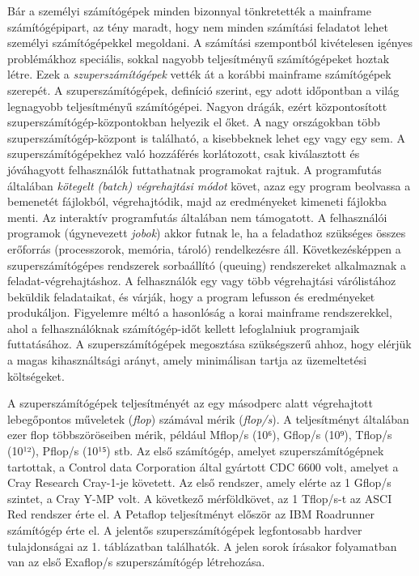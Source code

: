 \documentclass[
]{article}
\begin{document}
Bár a személyi számítógépek minden bizonnyal tönkretették a mainframe
számítógépipart, az tény maradt, hogy nem minden számítási feladatot
lehet személyi számítógépekkel megoldani. A számítási szempontból
kivételesen igényes problémákhoz speciális, sokkal nagyobb teljesítményű
számítógépeket hoztak létre. Ezek a \emph{szuperszámítógépek} vették át
a korábbi mainframe számítógépek szerepét. A szuperszámítógépek,
definíció szerint, egy adott időpontban a világ legnagyobb teljesítményű
számítógépei. Nagyon drágák, ezért központosított
szuperszámítógép-központokban helyezik el őket. A nagy országokban több
szuperszámítógép-központ is található, a kisebbeknek lehet egy vagy egy
sem. A szuperszámítógépekhez való hozzáférés korlátozott, csak
kiválasztott és jóváhagyott felhasználók futtathatnak programokat
rajtuk. A programfutás általában \emph{kötegelt (batch) végrehajtási
módot} követ, azaz egy program beolvassa a bemenetét fájlokból,
végrehajtódik, majd az eredményeket kimeneti fájlokba menti. Az
interaktív programfutás általában nem támogatott. A felhasználói
programok (úgynevezett \emph{jobok}) akkor futnak le, ha a feladathoz
szükséges összes erőforrás (processzorok, memória, tároló) rendelkezésre
áll. Következésképpen a szuperszámítógépes rendszerek sorbaállító
(queuing) rendszereket alkalmaznak a feladat-végrehajtáshoz. A
felhasználók egy vagy több végrehajtási várólistához beküldik
feladataikat, és várják, hogy a program lefusson és eredményeket
produkáljon. Figyelemre méltó a hasonlóság a korai mainframe
rendszerekkel, ahol a felhasználóknak számítógép-időt kellett
lefoglalniuk programjaik futtatásához. A szuperszámítógépek megosztása
szükségszerű ahhoz, hogy elérjük a magas kihasználtsági arányt, amely
minimálisan tartja az üzemeltetési költségeket.

A szuperszámítógépek teljesítményét az egy másodperc alatt végrehajtott
lebegőpontos műveletek (\emph{flop}) számával mérik (\emph{flop/s}). A
teljesítményt általában ezer flop többszöröseiben mérik, például Mflop/s
(10⁶), Gflop/s (10⁹), Tflop/s (10¹²), Pflop/s (10¹⁵) stb. Az első
számítógép, amelyet szuperszámítógépnek tartottak, a Control data
Corporation által gyártott CDC 6600 volt, amelyet a Cray Research
Cray-1-je követett. Az első rendszer, amely elérte az 1 Gflop/s szintet,
a Cray Y-MP volt. A következő mérföldkövet, az 1 Tflop/s-t az ASCI Red
rendszer érte el. A Petaflop teljesítményt először az IBM Roadrunner
számítógép érte el. A jelentős szuperszámítógépek legfontosabb hardver
tulajdonságai az 1. táblázatban találhatók. A jelen sorok írásakor
folyamatban van az első Exaflop/s szuperszámítógép létrehozása.
\end{document}
